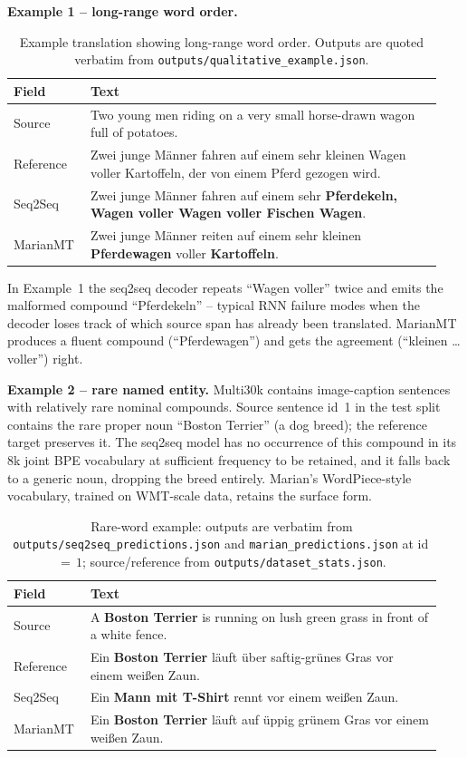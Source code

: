 \textbf{Example 1 -- long-range word order.}
\begin{table}[H]
\centering
\caption{Example translation showing long-range word order. Outputs are quoted verbatim from \texttt{outputs/qualitative\_example.json}.}
\label{tab:q4_qual1}
\small
\begin{tabular}{p{0.16\linewidth} p{0.78\linewidth}}
\toprule
\textbf{Field} & \textbf{Text} \\
\midrule
Source     & Two young men riding on a very small horse-drawn wagon full of potatoes. \\
Reference  & Zwei junge M\"anner fahren auf einem sehr kleinen Wagen voller Kartoffeln, der von einem Pferd gezogen wird. \\
Seq2Seq    & Zwei junge M\"anner fahren auf einem sehr \textbf{Pferdekeln, Wagen voller Wagen voller Fischen Wagen}. \\
MarianMT   & Zwei junge M\"anner reiten auf einem sehr kleinen \textbf{Pferdewagen} voller \textbf{Kartoffeln}. \\
\bottomrule
\end{tabular}
\end{table}

In Example~1 the seq2seq decoder repeats ``Wagen voller'' twice and emits the malformed compound ``Pferdekeln'' -- typical RNN failure modes when the decoder loses track of which source span has already been translated. MarianMT produces a fluent compound (``Pferdewagen'') and gets the agreement (``kleinen \dots voller'') right.

\textbf{Example 2 -- rare named entity.} Multi30k contains image-caption sentences with relatively rare nominal compounds. Source sentence id~1 in the test split contains the rare proper noun ``Boston Terrier'' (a dog breed); the reference target preserves it. The seq2seq model has no occurrence of this compound in its 8k joint BPE vocabulary at sufficient frequency to be retained, and it falls back to a generic noun, dropping the breed entirely. Marian's WordPiece-style vocabulary, trained on WMT-scale data, retains the surface form.

\begin{table}[H]
\centering
\caption{Rare-word example: outputs are verbatim from \texttt{outputs/seq2seq\_predictions.json} and \texttt{marian\_predictions.json} at id\,$=\,1$; source/reference from \texttt{outputs/dataset\_stats.json}.}
\label{tab:q4_qual2}
\small
\begin{tabular}{p{0.16\linewidth} p{0.78\linewidth}}
\toprule
\textbf{Field} & \textbf{Text} \\
\midrule
Source     & A \textbf{Boston Terrier} is running on lush green grass in front of a white fence. \\
Reference  & Ein \textbf{Boston Terrier} l\"auft \"uber saftig-gr\"unes Gras vor einem wei{\ss}en Zaun. \\
Seq2Seq    & Ein \textbf{Mann mit T-Shirt} rennt vor einem wei{\ss}en Zaun. \\
MarianMT   & Ein \textbf{Boston Terrier} l\"auft auf \"uppig gr\"unem Gras vor einem wei{\ss}en Zaun. \\
\bottomrule
\end{tabular}
\end{table}

